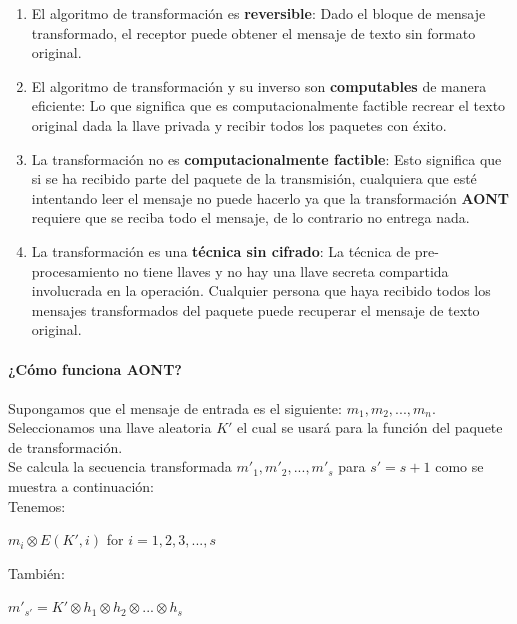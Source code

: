 \documentclass[12pt, a4paper, titlepage]{report}
\begin{document}
        \begin{enumerate}
            \item El algoritmo de transformación es \textbf{reversible}: Dado el bloque de mensaje transformado, el receptor puede obtener el mensaje de texto sin formato original.
            \item El algoritmo de transformación y su inverso son \textbf{computables} de manera eficiente: Lo que significa que es computacionalmente factible recrear el texto original dada la llave privada y recibir todos los paquetes con éxito.
            \item La transformación no es \textbf{computacionalmente factible}: Esto significa que si se ha recibido parte del paquete de la transmisión, cualquiera que esté intentando leer el mensaje no puede hacerlo ya que la transformación \textbf{AONT} requiere que se reciba todo el mensaje, de lo contrario no entrega nada.
            \item La transformación es una \textbf{técnica sin cifrado}: La técnica de pre-procesamiento no tiene llaves y no hay una llave secreta compartida involucrada en la operación. Cualquier persona que haya recibido todos los mensajes transformados del paquete puede recuperar el mensaje de texto original.
        \end{enumerate}
        
        \paragraph{}
        \textbf{¿Cómo funciona AONT?}
        
        \paragraph{}
        Supongamos que el mensaje de entrada es el siguiente: $m_{1},m_{2},...,m_{n}$.\\
        Seleccionamos una llave aleatoria $K'$ el cual se usará para la función del paquete de transformación.\\
        Se calcula la secuencia transformada ${m'}_{1}, {m'}_{2},...,{m'}_{s}$ para ${s'}=s+1$ como se muestra a continuación:\\
        Tenemos:
        \begin{center}
            $m_{i} \otimes E(K',i)$ for  $i=1,2,3,...,s$
        \end{center}
        También:
        \begin{center}
            $m'_{s'}=K' \otimes h_{1} \otimes h_{2} \otimes ... \otimes h_{s}$
        \end{center}
        
\end{document}
